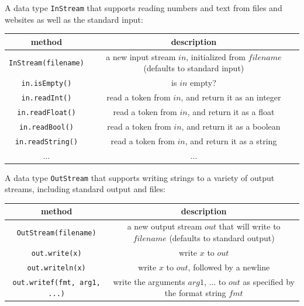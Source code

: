 \documentclass[8pt,a4paper,compress,handout]{beamer}
\begin{document}
\begin{frame}[fragile]
A data type \lstinline{InStream} that supports reading numbers and text from files and websites as well as the standard input:
\begin{center}
\begin{tabular}{cc}
method & description \\ \hline
\lstinline$InStream(filename)$ & \makecell{a new input stream $in$, initialized \\ from $filename$ (defaults to standard input)} \\
\lstinline$in.isEmpty()$ & is $in$ empty? \\
\lstinline$in.readInt()$ & read a token from $in$, and return it as an integer \\
\lstinline$in.readFloat()$ & read a token from $in$, and return it as a float \\
\lstinline$in.readBool()$ & read a token from $in$, and return it as a boolean \\
\lstinline$in.readString()$ & read a token from $in$, and return it as a string \\
$\dots$ & $\dots$
\end{tabular} 
\end{center}

\bigskip

A data type \lstinline{OutStream} that supports writing strings to a variety of output streams, including standard output and files:
\begin{center}
\begin{tabular}{cc}
method & description \\ \hline
\lstinline$OutStream(filename)$ & \makecell{a new output stream $out$ that will write \\ to $filename$ (defaults to standard output)} \\
\lstinline$out.write(x)$ & write $x$ to $out$ \\
\lstinline$out.writeln(x)$ & write $x$ to $out$, followed by a newline \\
\lstinline$out.writef(fmt, arg1, ...)$ & \makecell{write the arguments $arg1$, $\dots$ to $out$ as \\ specified by the format string $fmt$}
\end{tabular} 
\end{center}
\end{frame}
\end{document}
